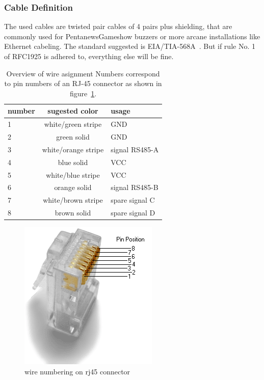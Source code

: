 \documentclass[a4paper,12pt]{scrartcl}
\begin{document}
\subsubsection{Cable Definition}
The used cables are twisted pair cables of 4 pairs plus shielding, that are commonly used for PentanewsGameshow buzzers
or more arcane installations like Ethernet cabeling.
The standard suggested is EIA/TIA-568A~\cite{EIA568}. But if rule No. 1 of RFC1925 \cite{RFC1925} is adhered to, everything else will be fine.

\begin{table}
	\centering
	\begin{tabular}{l c l}
		number        & sugested color      & usage \\
		\hline
		1             & white/green stripe  &   GND \\
		2             & green solid         &   GND \\
		3             & white/orange stripe &   signal RS485-A\\
		4             & blue solid          &   VCC \\
		5             & white/blue stripe   &   VCC \\
		6             & orange solid        &   signal RS485-B\\
		7             & white/brown stripe  &   spare signal C \\
		8             & brown solid         &   spare signal D \\
	\end{tabular}
	\caption{%
	Overview of wire asignment  \newline%
	Numbers correspond to pin numbers of an RJ-45 connector as shown in figure~\ref{fig:rj45}.
	}
	\label{tab:wires}
\end{table}

\begin{figure}
	\centering
	\includegraphics[scale=.7]{png/Rj45plug-8p8c.png}
	\caption{wire numbering on rj45 connector}
	\label{fig:rj45}
\end{figure}
\end{document}

